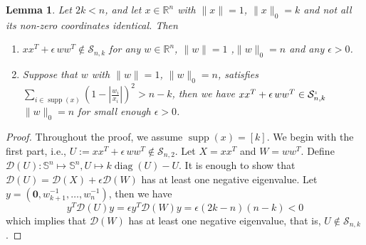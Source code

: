 \documentclass[11pt]{amsart}
\newcommand{\Szero}[2]{\ensuremath{\mathcal{S}_{#1,#2}}}
\newcommand{\Sint}[2]{\ensuremath{\mathcal{S}_{#1,#2}^{\textit{\tiny{z}}}}}
\theoremstyle{plain}
\newtheorem{lem}{Lemma}[section]
\theoremstyle{definition}
\theoremstyle{remark}
\newcommand{\cD}{{\mathcal{D}}}
\newcommand{\RR}{\mathbb{R}}
\renewcommand{\SS}{{\mathbb{S}}}
\newcommand{\vzero}{\mathbf{0}}
\DeclareMathOperator{\diag}{diag}
\DeclareMathOperator{\supp}{supp}
\begin{document}
\begin{appendices}
        \begin{lem}\label{lem:Sint}
		Let \(2k<n\), and let $x \in \RR^n$ with $\|x\|=1$, \(\|x\|_0=k\) and not all its non-zero coordinates identical.
        Then
		\begin{enumerate}
			\item 
            \(x x^T + \epsilon \, w w^T \notin \Szero{n}{k}\)
            for any $w \!\in\! \RR^n$, $\|w\|=1$ ,$\|w\|_0\!=\!n$ and any $\epsilon \!>\! 0$.
			\item
            Suppose that \(w\) with $\|w\|=1$, \(\|w\|_0=n\), satisfies \(\sum_{i\in\supp(x)}(1 - |\tfrac{w_i}{x_i}|)^2 > n - k\), then we have
            \(x x^T + \epsilon \, w w^T \in \Sint{n}{k}\)
            $\|w\|_0 \!=\! n$ for small enough $\epsilon \!>\! 0$.
		\end{enumerate}
	\end{lem}
		\begin{proof}
			Throughout the proof, we assume \( \supp(x) = [k]\). We begin with the first part, i.e., \(U := x x^T + \epsilon \, w w^T \notin \Szero{n}{2}\). Let \(X = xx^T\) and \(W = ww^T\). Define \(\cD (U): \SS^n\mapsto\SS^n, U\mapsto k\diag(U)-U\). It is enough to show that \(\cD(U)=\cD(X) + \epsilon\cD(W)\) has at least one negative eigenvalue.  Let \(y = (\vzero,w_{k+1}^{-1},\dots,w_{n}^{-1})\), then we have
			\begin{equation}
				y^T \cD(U) y = \epsilon y^T \cD(W) y = \epsilon (2k-n)(n-k)<0
			\end{equation}
			which implies that \(\cD(W)\) has at least one negative eigenvalue, that is, \(U\notin \Szero{n}{k}\).
			

\end{proof}
\end{appendices}
\end{document}
